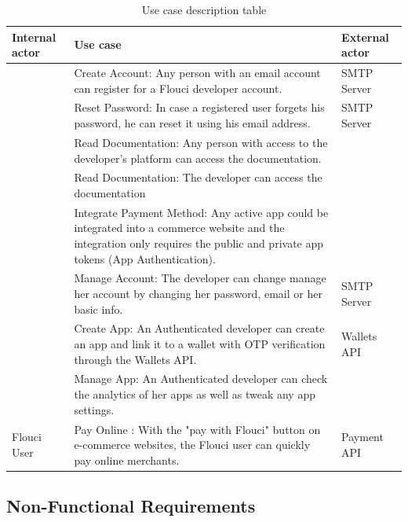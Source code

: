 \begin{spacing}{1.2}
\begin{table}[!h]
	\centering
	\caption{Use case description table}
	\footnotesize
	\begin{tabularx}
	{\linewidth}{|>{\centering{}\vspace*{\fill}}X|>{\centering{}\vspace*{\fill}}X|>{\vspace*{\fill}}X<{\centering{}}|}
			\hline
			 \bfseries Internal actor & \bfseries Use case &\bfseries External actor \\
			\hline
			\multirow{3}{*}{Anonymous Developer}			&	Create Account: Any person with an email account can register for a Flouci developer account. 	&	SMTP Server			\\
			\cline{2-3}
				& Reset Password: In case a registered user forgets his password, he can reset it using his email address. 		&		SMTP Server		\\
				\cline{2-3}
					&	Read Documentation: Any person with access to the developer's platform can access the documentation.	&				\\
			\hline
			\multirow{5}{*}{Registered Developer}					&	Read Documentation: The developer can access the documentation 	&				\\
			\cline{2-3}
			&	Integrate Payment Method: Any active app could be integrated into a commerce website and the integration only requires the public and private app tokens (App Authentication).	&				\\
			\cline{2-3}
					&	Manage Account:    The developer can change manage her account by changing her password, email or her basic info.	&		SMTP Server	\\
					\cline{2-3}
					&	Create App: An Authenticated developer can create an app and link it to a wallet with OTP verification through the Wallets API.	&			Wallets API	\\
					\cline{2-3}
					&	Manage App:	 An Authenticated  developer can check the analytics of her apps as well as tweak any app settings. &				\\

			\hline
			Flouci User	& Pay Online : With the "pay with Flouci" button on e-commerce websites, the Flouci user can quickly pay online merchants.  	&	Payment API	\\

			\hline
	\end{tabularx}
	\label{tab:usecasediagram}
\end{table}


\subsection{Non-Functional Requirements}

\end{spacing}
